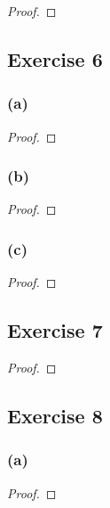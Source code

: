 \documentclass[14pt]{extarticle}
\begin{document}
\begin{proof}

\end{proof}

\subsection{Exercise 6}

\subsubsection{(a)}

\begin{proof}

\end{proof}

\subsubsection{(b)}

\begin{proof}

\end{proof}

\subsubsection{(c)}

\begin{proof}

\end{proof}

\subsection{Exercise 7}

\begin{proof}

\end{proof}

\subsection{Exercise 8}

\subsubsection{(a)}

\begin{proof}

\end{proof}
\end{document}
